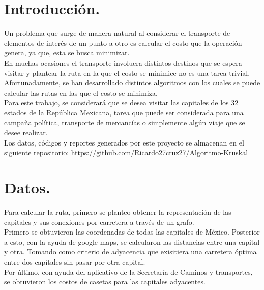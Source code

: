 \documentclass[14pt, letterpaper]{article}
\begin{document}
\pagebreak
\tableofcontents

\cleardoublepage
\pagebreak
\section{Introducción.}
Un problema que surge de manera natural al considerar el transporte de elementos de interés de un punto a otro es calcular el costo que la operación genera, ya que, esta se busca minimizar.\\

En muchas ocasiones el transporte involucra distintos destinos que se espera visitar y plantear la ruta en la que el costo se minimice no es una tarea trivial.\\

Afortunadamente, se han desarrollado distintos algoritmos con los cuales se puede calcular las rutas en las que el costo se minimiza.\\

Para este trabajo, se considerará que se desea visitar las capitales de los 32 estados de la República Mexicana, tarea que puede ser considerada para una campaña política, transporte de mercancías o simplemente algún viaje que se desee realizar.\\

Los datos, códigos y reportes generados por este proyecto se almacenan en el siguiente repositorio:
\url{https://github.com/Ricardo27cruz27/Algoritmo-Kruskal}


\section{Datos.}

Para calcular la ruta, primero se planteo obtener la representación de las capitales y sus conexiones por carretera a través de un grafo.\\

Primero se obtuvieron las coordenadas de todas las capitales de México. Posterior a esto, con la ayuda de google maps, se calcularon las distancias entre una capital y otra. Tomando como criterio de adyacencia que exisitiera una carretera óptima entre dos capitales sin pasar por otra capital.\\

Por último, con ayuda del aplicativo de la Secretaría de Caminos y transportes, se obtuvieron los costos de casetas para las capitales adyacentes. \\
\end{document}
